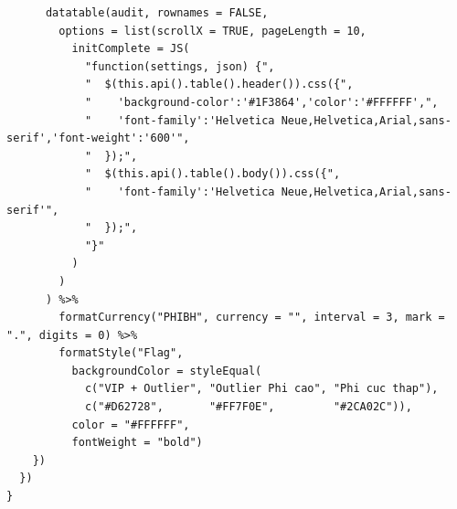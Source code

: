 \documentclass[12pt, a4paper]{article}
\begin{document}
\begin{lstlisting}
      datatable(audit, rownames = FALSE,
        options = list(scrollX = TRUE, pageLength = 10,
          initComplete = JS(
            "function(settings, json) {",
            "  $(this.api().table().header()).css({",
            "    'background-color':'#1F3864','color':'#FFFFFF',",
            "    'font-family':'Helvetica Neue,Helvetica,Arial,sans-serif','font-weight':'600'",
            "  });",
            "  $(this.api().table().body()).css({",
            "    'font-family':'Helvetica Neue,Helvetica,Arial,sans-serif'",
            "  });",
            "}"
          )
        )
      ) %>%
        formatCurrency("PHIBH", currency = "", interval = 3, mark = ".", digits = 0) %>%
        formatStyle("Flag",
          backgroundColor = styleEqual(
            c("VIP + Outlier", "Outlier Phi cao", "Phi cuc thap"),
            c("#D62728",       "#FF7F0E",         "#2CA02C")),
          color = "#FFFFFF",
          fontWeight = "bold")
    })
  })
}
\end{lstlisting}
\newpage
\end{document}
